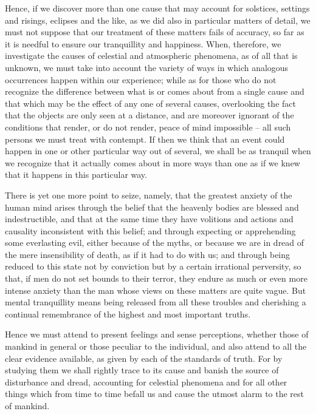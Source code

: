 \documentclass{stex}
\begin{document}
Hence, if we discover more than one cause that may account for solstices, settings and risings, eclipses and the like, as we did also in particular matters of detail, we must not suppose that our treatment of these matters fails of accuracy, so far as it is needful to ensure our tranquillity and happiness.
When, therefore, we investigate the causes of celestial and atmospheric phenomena, as of all that is unknown, we must take into account the variety of ways in which analogous occurrences happen within our experience; while as for those who do not recognize the difference between what is or comes about from a single cause and that which may be the effect of any one of several causes, overlooking the fact that the objects are only seen at a distance, and are moreover ignorant of the conditions that render, or do not render, peace of mind impossible – all such persons we must treat with contempt.
If then we think that an event could happen in one or other particular way out of several, we shall be as tranquil when we recognize that it actually comes about in more ways than one as if we knew that it happens in this particular way.

There is yet one more point to seize, namely, that the greatest anxiety of the human mind arises through the belief that the heavenly bodies are blessed and indestructible, and that at the same time they have volitions and actions and causality inconsistent with this belief; and through expecting or apprehending some everlasting evil, either because of the myths, or because we are in dread of the mere insensibility of death, as if it had to do with us; and through being reduced to this state not by conviction but by a certain irrational perversity, so that, if men do not set bounds to their terror, they endure as much or even more intense anxiety than the man whose views on these matters are quite vague.
But mental tranquillity means being released from all these troubles and cherishing a continual remembrance of the highest and most important truths.

Hence we must attend to present feelings and sense perceptions, whether those of mankind in general or those peculiar to the individual, and also attend to all the clear evidence available, as given by each of the standards of truth.
For by studying them we shall rightly trace to its cause and banish the source of disturbance and dread, accounting for celestial phenomena and for all other things which from time to time befall us and cause the utmost alarm to the rest of mankind.
\end{document}

